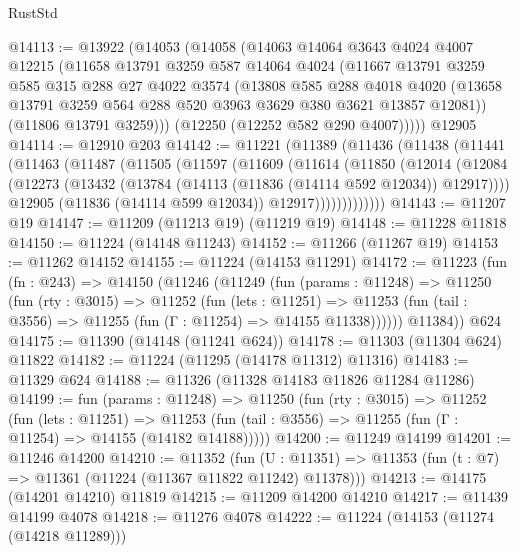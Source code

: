 \begin{lexlean}{RustStd}
\begin{coremodule}
@14113 := @13922
    (@14053
      (@14058
        (@14063
          @14064
          @3643
          @4024
          @4007
          @12215
          (@11658
            @13791
            @3259
            @587
            @14064
            @4024
            (@11667
              @13791
              @3259
              @585
              @315
              @288
              @27
              @4022
              @3574
              (@13808
                @585
                @288
                @4018
                @4020
                (@13658 @13791 @3259 @564 @288 @520 @3963 @3629 @380 @3621 @13857 @12081))
              (@11806 @13791 @3259)))
          (@12250 (@12252 @582 @290 @4007)))))
    @12905
@14114 := @12910 @203
@14142 := @11221
    (@11389
      (@11436
        (@11438
          (@11441
            (@11463
              (@11487
                (@11505
                  (@11597
                    (@11609
                      (@11614
                        (@11850
                          (@12014
                            (@12084
                              (@12273
                                (@13432 (@13784 (@14113 (@11836 (@14114 @592 @12034)) @12917))))
                              @12905
                              (@11836 (@14114 @599 @12034))
                              @12917)))))))))))))
@14143 := @11207 @19
@14147 := @11209 (@11213 @19) (@11219 @19)
@14148 := @11228 @11818
@14150 := @11224 (@14148 @11243)
@14152 := @11266 (@11267 @19)
@14153 := @11262 @14152
@14155 := @11224 (@14153 @11291)
@14172 := @11223
    (fun (fn : @243) =>
    @14150
      (@11246
        (@11249
          (fun (params : @11248) =>
          @11250
            (fun (rty : @3015) =>
            @11252
              (fun (lets : @11251) =>
              @11253 (fun (tail : @3556) => @11255 (fun (Γ : @11254) => @14155 @11338))))))
        @11384))
    @624
@14175 := @11390 (@14148 (@11241 @624))
@14178 := @11303 (@11304 @624) @11822
@14182 := @11224 (@11295 (@14178 @11312) @11316)
@14183 := @11329 @624
@14188 := @11326 (@11328 @14183 @11826 @11284 @11286)
@14199 := fun (params : @11248) =>
  @11250
    (fun (rty : @3015) =>
    @11252
      (fun (lets : @11251) =>
      @11253 (fun (tail : @3556) => @11255 (fun (Γ : @11254) => @14155 (@14182 @14188)))))
@14200 := @11249 @14199
@14201 := @11246 @14200
@14210 := @11352
    (fun (U : @11351) => @11353 (fun (t : @7) => @11361 (@11224 (@11367 @11822 @11242) @11378)))
@14213 := @14175 (@14201 @14210) @11819
@14215 := @11209 @14200 @14210
@14217 := @11439 @14199 @4078
@14218 := @11276 @4078
@14222 := @11224 (@14153 (@11274 (@14218 @11289)))

\end{coremodule}
\end{lexlean}
